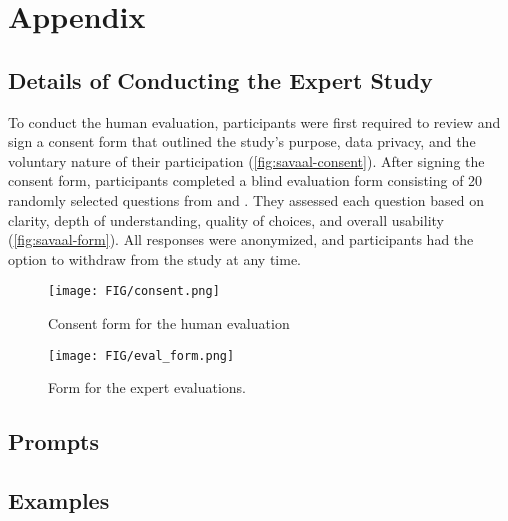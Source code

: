 \clearpage
\appendix


\section{Appendix}




\subsection{Details of Conducting the Expert Study}
\label{subsec:appendix_human_eval_conduct}

To conduct the human evaluation, participants were first required to review and sign a consent form that outlined the study's purpose, data privacy, and the voluntary nature of their participation (\autoref{fig:savaal-consent}). After signing the consent form, participants completed a blind evaluation form consisting of 20 randomly selected questions from \name and \Baseline. They assessed each question based on clarity, depth of understanding, quality of choices, and overall usability (\autoref{fig:savaal-form}). All responses were anonymized, and participants had the option to withdraw from the study at any time.
\begin{figure*}[h]
\centering
\texttt{[image: FIG/consent.png]}
    \caption{Consent form for the human evaluation}
    \label{fig:savaal-consent}
\end{figure*}
\begin{figure*}[h]
\centering
\texttt{[image: FIG/eval\_form.png]}
    \caption{Form for the expert evaluations.}
    \label{fig:savaal-form}
\end{figure*}


% 


\subsection{Prompts}
\label{subsec:appendix_prompts}




\subsection{Examples}
\label{subsec:appendix_examples}


